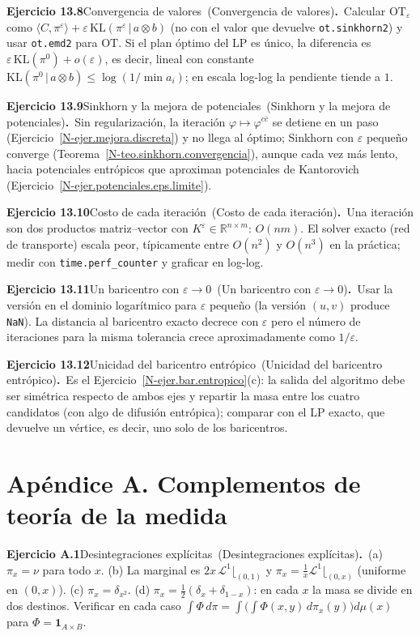 \documentclass[11pt,a4paper]{amsart}
\newcommand{\ve}{\varepsilon}
\newcommand{\R}{{\mathbb R}}
\newcommand{\LL}{{\mathcal L}}
\newcommand{\I}{{\mathbf 1}}
\theoremstyle{remark}
\theoremstyle{definition}
\numberwithin{subsection}{section}
\numberwithin{equation}{section}
\newcommand{\ejlabel}[2]{\par\medskip\noindent\textbf{Ejercicio #1}\ifx\relax#2\relax\else\ (#2)\fi\textbf{.}\ }
\begin{document}
\ejlabel{13.8}{Convergencia de valores}Calcular $\mathrm{OT}_\ve$ como $\langle C,\pi^\ve\rangle+\ve\,\mathrm{KL}(\pi^\ve\,|\,a\otimes b)$ (no con el valor que devuelve \texttt{ot.sinkhorn2}) y usar \texttt{ot.emd2} para $\mathrm{OT}$. Si el plan óptimo del LP es único, la diferencia es $\ve\,\mathrm{KL}(\pi^0)+o(\ve)$, es decir, lineal con constante $\mathrm{KL}(\pi^0\,|\,a\otimes b)\le\log(1/\min a_i)$; en escala log-log la pendiente tiende a $1$.

\ejlabel{13.9}{Sinkhorn y la mejora de potenciales}Sin regularización, la iteración $\varphi\mapsto\varphi^{c\bar c}$ se detiene en un paso (Ejercicio~\ref{N-ejer.mejora.discreta}) y no llega al óptimo; Sinkhorn con $\ve$ pequeño converge (Teorema~\ref{N-teo.sinkhorn.convergencia}), aunque cada vez más lento, hacia potenciales entrópicos que aproximan potenciales de Kantorovich (Ejercicio~\ref{N-ejer.potenciales.eps.limite}).

\ejlabel{13.10}{Costo de cada iteración}Una iteración son dos productos matriz--vector con $K^\ve\in\R^{n\times m}$: $O(nm)$. El solver exacto (red de transporte) escala peor, típicamente entre $O(n^2)$ y $O(n^3)$ en la práctica; medir con \texttt{time.perf\_counter} y graficar en log-log.

\ejlabel{13.11}{Un baricentro con $\ve\to0$}Usar la versión en el dominio logarítmico para $\ve$ pequeño (la versión $(u,v)$ produce \texttt{NaN}). La distancia al baricentro exacto decrece con $\ve$ pero el número de iteraciones para la misma tolerancia crece aproximadamente como $1/\ve$.

\ejlabel{13.12}{Unicidad del baricentro entrópico}Es el Ejercicio~\ref{N-ejer.bar.entropico}(c): la salida del algoritmo debe ser simétrica respecto de ambos ejes y repartir la masa entre los cuatro candidatos (con algo de difusión entrópica); comparar con el LP exacto, que devuelve un vértice, es decir, uno solo de los baricentros.

\section*{Apéndice A. Complementos de teoría de la medida}
\ejlabel{A.1}{Desintegraciones explícitas}(a) $\pi_x=\nu$ para todo $x$. (b) La marginal es $2x\,\LL^1\lfloor_{(0,1)}$ y $\pi_x=\frac1x\LL^1\lfloor_{(0,x)}$ (uniforme en $(0,x)$). (c) $\pi_x=\delta_{x^2}$. (d) $\pi_x=\frac12(\delta_x+\delta_{1-x})$: en cada $x$ la masa se divide en dos destinos. Verificar en cada caso $\int\Phi\,d\pi=\int\bigl(\int\Phi(x,y)\,d\pi_x(y)\bigr)d\mu(x)$ para $\Phi=\I_{A\times B}$.
\end{document}
